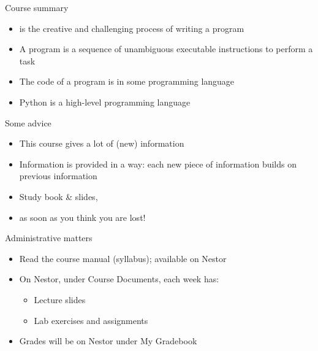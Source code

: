 \documentclass[aspectratio=169,usenames,dvipsnames]{beamer}
\begin{document}
\begin{frame}{Course summary}
    \begin{itemize}
        \item {} is the creative and challenging process
            of writing a program
        \item A program is a sequence of unambiguous executable
            instructions to perform a task
        \item The code of a program is in some programming language
        \item Python is a high-level programming language
    \end{itemize}
\end{frame}

\begin{frame}{Some advice}
    \begin{itemize}
        \item This course gives a lot of (new) information
        \item Information is provided in a  way:
            each new piece of information builds on previous information
        \item Study book \& slides, 
        \item {} as soon as you think you are lost!
    \end{itemize}
\end{frame}

\begin{frame}{Administrative matters}
    \begin{itemize}
        \item Read the course manual (syllabus); available on Nestor
        \item On Nestor, under Course Documents, each week has:
            \begin{itemize}
                \item Lecture slides
                \item Lab exercises and assignments
            \end{itemize}
        \item Grades will be on Nestor under My Gradebook
    \end{itemize}
\end{frame}
\end{document}
